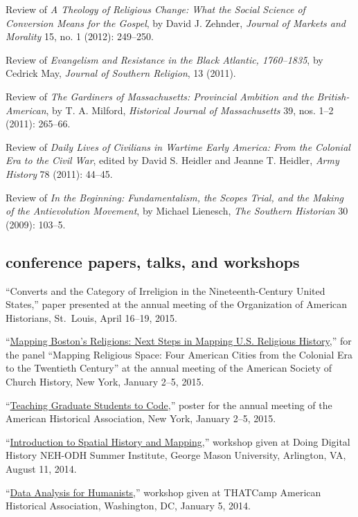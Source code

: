 \documentclass[11pt]{article}
\begin{document}
Review of \emph{A Theology of Religious Change: What the Social Science
of Conversion Means for the Gospel}, by David J. Zehnder, \emph{Journal
of Markets and Morality} 15, no. 1 (2012): 249--250.

Review of \emph{Evangelism and Resistance in the Black Atlantic,
1760--1835}, by Cedrick May, \emph{Journal of Southern Religion}, 13
(2011).

Review of \emph{The Gardiners of Massachusetts: Provincial Ambition and
the British-American}, by T. A. Milford, \emph{Historical Journal of
Massachusetts} 39, nos. 1--2 (2011): 265--66.

Review of \emph{Daily Lives of Civilians in Wartime Early America: From
the Colonial Era to the Civil War}, edited by David S. Heidler and
Jeanne T. Heidler, \emph{Army History} 78 (2011): 44--45.

Review of \emph{In the Beginning: Fundamentalism, the Scopes Trial, and
the Making of the Antievolution Movement}, by Michael Lienesch,
\emph{The Southern Historian} 30 (2009): 103--5.

\subsection{conference papers, talks, and
workshops}\label{conference-papers-talks-and-workshops}

``Converts and the Category of Irreligion in the Nineteenth-Century
United States,'' paper presented at the annual meeting of the
Organization of American Historians, St.~Louis, April 16--19, 2015.

``\href{http://lincolnmullen.com/projects/asch-2015/}{Mapping Boston's
Religions: Next Steps in Mapping U.S. Religious History},'' for the
panel ``Mapping Religious Space: Four American Cities from the Colonial
Era to the Twentieth Century'' at the annual meeting of the American
Society of Church History, New York, January 2--5, 2015.

``\href{http://lincolnmullen.com/blog/poster-teaching-graduate-students-to-code/}{Teaching
Graduate Students to Code},'' poster for the annual meeting of the
American Historical Association, New York, January 2--5, 2015.

``\href{/workshops/}{Introduction to Spatial History and Mapping},''
workshop given at Doing Digital History NEH-ODH Summer Institute, George
Mason University, Arlington, VA, August 11, 2014.

``\href{/workshops/}{Data Analysis for Humanists},'' workshop given at
THATCamp American Historical Association, Washington, DC, January 5,
2014.
\end{document}
